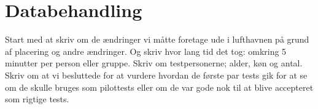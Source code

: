 \chapter{Databehandling}
\label{ParametreDatabehandling}
%
Start med at skriv om de ændringer vi måtte foretage ude i lufthavnen på grund af placering og andre ændringer. Og skriv hvor lang tid det tog: omkring 5 minutter per person eller gruppe. Skriv om testpersonerne; alder, køn og antal. Skriv om at vi besluttede for at vurdere hvordan de første par tests gik for at se om de skulle bruges som pilottests eller om de var gode nok til at blive accepteret som rigtige tests. 
